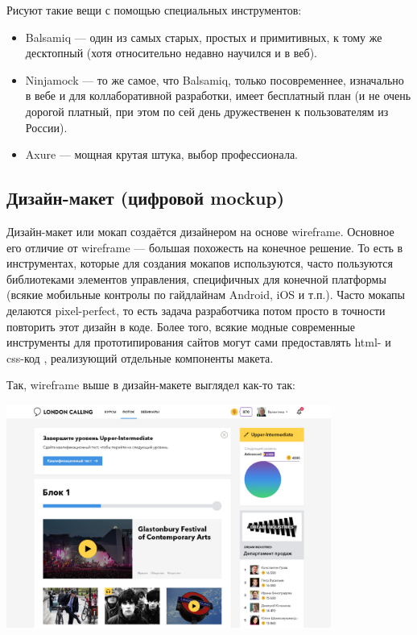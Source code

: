 \documentclass{../../text-style}
\begin{document}
Рисуют такие вещи с помощью специальных инструментов:

\begin{itemize}
    \item Balsamiq --- один из самых старых, простых и примитивных, к тому же десктопный (хотя относительно недавно научился и в веб).
    \item Ninjamock --- то же самое, что Balsamiq, только посовременнее, изначально в вебе и для коллаборативной разработки, имеет бесплатный план (и не очень дорогой платный, при этом по сей день дружественен к пользователям из России).
    \item Axure --- мощная крутая штука, выбор профессионала.
\end{itemize}

\subsection{Дизайн-макет (цифровой mockup)}

Дизайн-макет или мокап создаётся дизайнером на основе wireframe. Основное его отличие от wireframe --- большая похожесть на конечное решение. То есть в инструментах, которые для создания мокапов используются, часто пользуются библиотеками элементов управления, специфичных для конечной платформы (всякие мобильные контролы по гайдлайнам Android, iOS и т.п.). Часто мокапы делаются pixel-perfect, то есть задача разработчика потом просто в точности повторить этот дизайн в коде. Более того, всякие модные современные инструменты для прототипирования сайтов могут сами предоставлять html- и css-код , реализующий отдельные компоненты макета.

Так, wireframe выше в дизайн-макете выглядел как-то так:

\begin{center}
    \includegraphics[width=0.8\textwidth]{designLayout.png}
\end{center}
\end{document}
